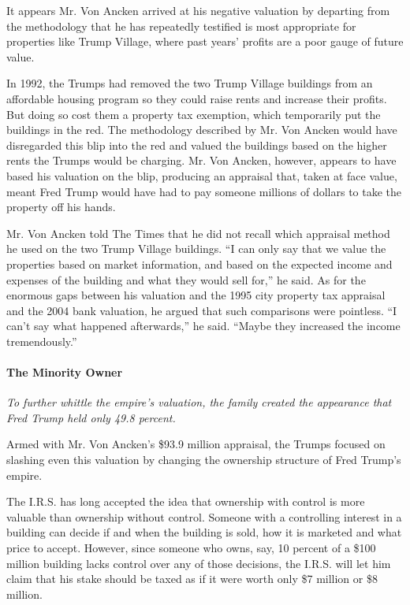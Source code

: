 It appears Mr. Von Ancken arrived at his negative valuation by departing
from the methodology that he has repeatedly testified is most
appropriate for properties like Trump Village, where past years' profits
are a poor gauge of future value.

In 1992, the Trumps had removed the two Trump Village buildings from an
affordable housing program so they could raise rents and increase their
profits. But doing so cost them a property tax exemption, which
temporarily put the buildings in the red. The methodology described by
Mr. Von Ancken would have disregarded this blip into the red and valued
the buildings based on the higher rents the Trumps would be charging.
Mr. Von Ancken, however, appears to have based his valuation on the
blip, producing an appraisal that, taken at face value, meant Fred Trump
would have had to pay someone millions of dollars to take the property
off his hands.

Mr. Von Ancken told The Times that he did not recall which appraisal
method he used on the two Trump Village buildings. ``I can only say that
we value the properties based on market information, and based on the
expected income and expenses of the building and what they would sell
for,'' he said. As for the enormous gaps between his valuation and the
1995 city property tax appraisal and the 2004 bank valuation, he argued
that such comparisons were pointless. ``I can't say what happened
afterwards,'' he said. ``Maybe they increased the income tremendously.''

\hypertarget{the-minority-owner}{%
\paragraph{The Minority Owner}\label{the-minority-owner}}

\emph{To further whittle the empire's valuation, the family created the
appearance that Fred Trump held only 49.8 percent.}

Armed with Mr. Von Ancken's \$93.9 million appraisal, the Trumps focused
on slashing even this valuation by changing the ownership structure of
Fred Trump's empire.

The I.R.S. has long accepted the idea that ownership with control is
more valuable than ownership without control. Someone with a controlling
interest in a building can decide if and when the building is sold, how
it is marketed and what price to accept. However, since someone who
owns, say, 10 percent of a \$100 million building lacks control over any
of those decisions, the I.R.S. will let him claim that his stake should
be taxed as if it were worth only \$7 million or \$8 million.

